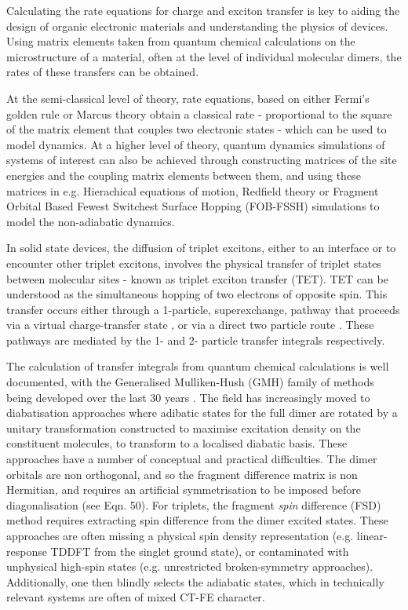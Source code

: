 \documentclass[aps,physrev,reprint,superscriptaddress,nofootinbib,amsmath,amssymb,a4paper]{revtex4-2}
\begin{document}
Calculating the rate equations for charge and exciton transfer is key to aiding the design of organic electronic materials \cite{Dimitriev2022, Zhang2023, Burlingame2023} and understanding the physics of devices. Using matrix elements taken from quantum chemical calculations on the microstructure of a material, often at the level of individual molecular dimers, the rates of these transfers can be obtained\cite{Bredas2002, Krueger1998}.

At the semi-classical level of theory, rate equations, based on either Fermi's golden rule \cite{Liu2024, Weal2024} or Marcus theory \cite{Marcus1965, Wang2024, Pelzer2016} obtain a classical rate - proportional to the square of the matrix element that couples two electronic states - which can be used to model dynamics. At a higher level of theory,  quantum dynamics simulations of systems of interest can also be achieved through constructing matrices of the site energies and the coupling matrix elements between them, and using these matrices in e.g.  Hierachical equations of motion\cite{creed2026quantum, Bai2024, Kelly2020}, Redfield theory \cite{Lee2015, Jankovi2020, Alesadi2022} or Fragment Orbital Based Fewest Switchest Surface Hopping (FOB-FSSH) \cite{Carof2017, Spencer2016} simulations to model the non-adiabatic dynamics.  

In solid state devices, the diffusion of triplet excitons, either to an interface or to encounter other triplet excitons, involves the physical transfer of triplet states between molecular sites - known as triplet exciton transfer (TET).  TET can be understood as the simultaneous hopping of two electrons of opposite spin. This transfer occurs either through a 1-particle, superexchange, pathway that proceeds via a virtual charge-transfer state \cite{Scholes1994}, or via a direct two particle route \cite{Scholes1994, Dexter1953}. These pathways are mediated by the 1- and 2- particle transfer integrals respectively.

The calculation of transfer integrals from quantum chemical calculations is well documented, with the Generalised Mulliken-Hush (GMH) family of methods being developed over the last 30 years \cite{Cave1996}. The field has increasingly moved to diabatisation approaches where adibatic states for the full dimer are rotated by a unitary transformation constructed to maximise excitation density on the constituent molecules, to transform to a localised diabatic basis\cite{You2013}. These approaches have a number of conceptual and practical difficulties. The dimer orbitals are non orthogonal, and so the fragment difference matrix is non Hermitian, and requires an artificial symmetrisation to be imposed before diagonalisation (see \cite{You2013} Eqn. 50). For triplets, the fragment \emph{spin} difference (FSD) method requires extracting spin difference from the dimer excited states. These approaches are often missing a physical spin density representation (e.g. linear-response TDDFT from the singlet ground state), or contaminated with unphysical high-spin states (e.g. unrestricted broken-symmetry approaches). Additionally, one then blindly selects the adiabatic states, which in technically relevant systems are often of mixed CT-FE character. 
\end{document}
